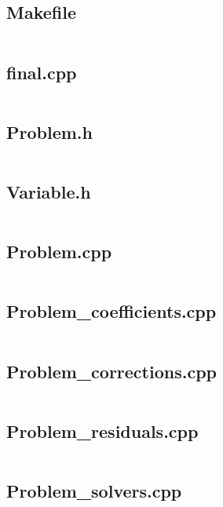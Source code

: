 \documentclass{article}
\begin{document}
\subsection*{Makefile}
\inputminted[fontsize=\scriptsize]{Makefile}{../Makefile}

\subsection*{final.cpp}
\inputminted[fontsize=\scriptsize]{c++}{../final.cpp}

\newpage
\subsection*{Problem.h}
\inputminted[fontsize=\scriptsize]{c++}{../Problem.h}

\newpage
\subsection*{Variable.h}
\inputminted[fontsize=\scriptsize]{c++}{../Variable.h}

\newpage
\subsection*{Problem.cpp}
\inputminted[fontsize=\scriptsize]{c++}{../Problem.cpp}

\newpage
\subsection*{Problem\_coefficients.cpp}
\inputminted[fontsize=\scriptsize]{c++}{../Problem_coefficients.cpp}

\newpage
\subsection*{Problem\_corrections.cpp}
\inputminted[fontsize=\scriptsize]{c++}{../Problem_corrections.cpp}

\newpage
\subsection*{Problem\_residuals.cpp}
\inputminted[fontsize=\scriptsize]{c++}{../Problem_residuals.cpp}

\newpage
\subsection*{Problem\_solvers.cpp}
\inputminted[fontsize=\scriptsize]{c++}{../Problem_solvers.cpp}
\end{document}
